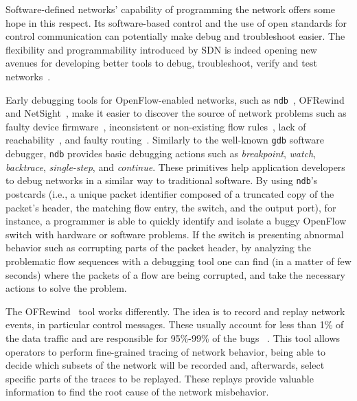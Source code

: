 Software-defined networks' capability of programming the network offers some hope in this respect.
Its software-based control and the use of open standards for control communication can potentially make debug and troubleshoot easier.
The flexibility and 
programmability introduced by SDN is indeed opening new avenues for developing better tools to debug, troubleshoot, 
verify and test networks~\cite{handigol2012-1,wundsam2011,canini2012-1,rotsos2012-1,al-shaer2010,khurshid2012,kuzniar2012,altekar2010,kuzniar2012}.

Early debugging tools for OpenFlow-enabled networks, such as \texttt{ndb}~\cite{handigol2012-1}, OFRewind~\cite{wundsam2011} and NetSight~\cite{handigol2014}, make it easier to discover the source of network problems such as faulty device firmware~\cite{handigol2012-1}, inconsistent or 
non-existing flow rules~\cite{handigol2012-1,wundsam2011}, lack of reachability~\cite{handigol2012-1,wundsam2011}, and faulty routing~\cite{handigol2012-1,wundsam2011}.
Similarly to the well-known \texttt{gdb} software debugger, \texttt{ndb} provides basic debugging 
actions such as \textit{breakpoint}, \textit{watch}, \textit{backtrace}, \textit{single-step}, and 
\textit{continue}. These primitives help application developers to debug networks in a similar way 
to traditional software.
By using \texttt{ndb}'s postcards (i.e., a unique packet identifier composed of a truncated copy of the packet's header, the matching flow entry, the switch, and the output port), for instance, a programmer is able to quickly identify 
and isolate a buggy OpenFlow switch with hardware or software problems. 
If the switch is 
presenting abnormal behavior such as corrupting parts of the packet header, by 
analyzing the problematic flow sequences with a debugging tool one can find (in a matter of few seconds) where 
the packets of a flow are being corrupted, and take the necessary actions to solve the problem.

The OFRewind~\cite{wundsam2011} tool works differently. The idea is to record and 
replay network events, in particular control messages.
These usually account for less than 1\% of the data 
traffic and are responsible for 95\%-99\% of the bugs ~\cite{altekar2010}. 
This tool allows operators to 
perform fine-grained tracing of network behavior, being able to decide which subsets of the network will 
be recorded and, afterwards, select specific parts of the traces to be replayed. These replays provide 
valuable information to find the root cause of the network misbehavior.

